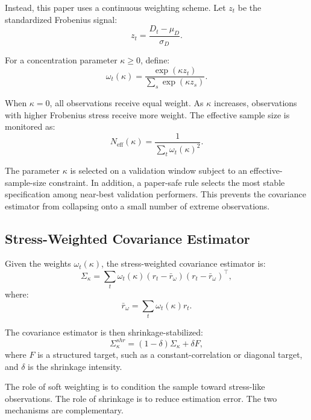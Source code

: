 \documentclass[11pt]{article}
\begin{document}
Instead, this paper uses a continuous weighting scheme. Let $z_t$ be the standardized Frobenius signal:
\begin{equation}
z_t = \frac{D_t - \mu_D}{\sigma_D}.
\end{equation}

For a concentration parameter $\kappa \geq 0$, define:
\begin{equation}
\omega_t(\kappa) =
\frac{\exp(\kappa z_t)}
{\sum_s \exp(\kappa z_s)}.
\end{equation}

When $\kappa=0$, all observations receive equal weight. As $\kappa$ increases, observations with higher Frobenius stress receive more weight. The effective sample size is monitored as:
\begin{equation}
N_{\mathrm{eff}}(\kappa) =
\frac{1}{\sum_t \omega_t(\kappa)^2}.
\end{equation}

The parameter $\kappa$ is selected on a validation window subject to an effective-sample-size constraint. In addition, a paper-safe rule selects the most stable specification among near-best validation performers. This prevents the covariance estimator from collapsing onto a small number of extreme observations.

\subsection{Stress-Weighted Covariance Estimator}

Given the weights $\omega_t(\kappa)$, the stress-weighted covariance estimator is:
\begin{equation}
\Sigma_{\kappa}
=
\sum_t \omega_t(\kappa)
(r_t - \bar{r}_{\omega})(r_t - \bar{r}_{\omega})^\top,
\end{equation}
where:
\begin{equation}
\bar{r}_{\omega} = \sum_t \omega_t(\kappa) r_t.
\end{equation}

The covariance estimator is then shrinkage-stabilized:
\begin{equation}
\Sigma_{\kappa}^{shr}
=
(1-\delta)\Sigma_{\kappa} + \delta F,
\end{equation}
where $F$ is a structured target, such as a constant-correlation or diagonal target, and $\delta$ is the shrinkage intensity.

The role of soft weighting is to condition the sample toward stress-like observations. The role of shrinkage is to reduce estimation error. The two mechanisms are complementary.
\end{document}
